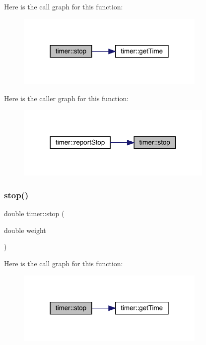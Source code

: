 Here is the call graph for this function\+:\nopagebreak
\begin{figure}[H]
\begin{center}
\leavevmode
\includegraphics[width=258pt]{structtimer_a6008e62616dc97a34f52df092cd43cb1_cgraph}
\end{center}
\end{figure}
Here is the caller graph for this function\+:\nopagebreak
\begin{figure}[H]
\begin{center}
\leavevmode
\includegraphics[width=269pt]{structtimer_a6008e62616dc97a34f52df092cd43cb1_icgraph}
\end{center}
\end{figure}
\mbox{\label{structtimer_ab13f3fefbcf9427b0bb9e2081ea3aea1}} 
\subsubsection{\texorpdfstring{stop()}{stop()}\hspace{0.1cm}{\footnotesize\ttfamily [2/2]}}
{\footnotesize\ttfamily double timer\+::stop (\begin{DoxyParamCaption}\item[{double}]{weight }\end{DoxyParamCaption})\hspace{0.3cm}{\ttfamily [inline]}}

Here is the call graph for this function\+:\nopagebreak
\begin{figure}[H]
\begin{center}
\leavevmode
\includegraphics[width=258pt]{structtimer_ab13f3fefbcf9427b0bb9e2081ea3aea1_cgraph}
\end{center}
\end{figure}
\mbox{\label{structtimer_a1d51e750078352abcabedc232e122dbc}} 
